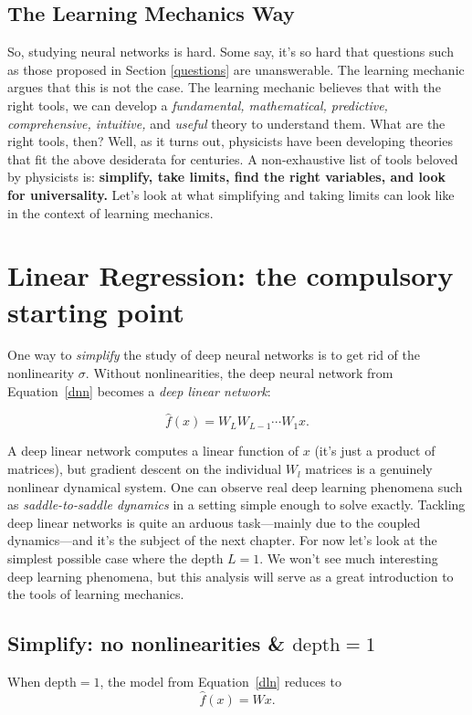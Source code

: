 \subsection{The Learning Mechanics Way}

So, studying neural networks is hard. Some say, it's so hard that questions such as those proposed in Section \ref{questions} are unanswerable. The learning mechanic argues that this is not the case. The learning mechanic believes that with the right tools, we can develop a \textit{fundamental, mathematical, predictive, comprehensive, intuitive,} and \textit{useful} theory to understand them. What are the right tools, then? Well, as it turns out, physicists have been developing theories that fit the above desiderata for centuries. A non-exhaustive list of tools beloved by physicists is: \textbf{simplify, take limits, find the right variables, and look for universality.} Let's look at what simplifying and taking limits can look like in the context of learning mechanics.

\section{Linear Regression: the compulsory starting point}

One way to \textit{simplify} the study of deep neural networks is to get rid of the nonlinearity $\sigma$. Without nonlinearities, the deep neural network from Equation~\eqref{dnn} becomes a \textit{deep linear network}:

\begin{equation}
    \hat{f}(x) = W_L W_{L-1} \cdots W_1 x.
    \label{dln}
\end{equation}

A deep linear network computes a linear function of $x$ (it's just a product of matrices), but gradient descent on the individual $W_{l}$ matrices is a genuinely nonlinear dynamical system. One can observe real deep learning phenomena such as \textit{saddle-to-saddle dynamics} in a setting simple enough to solve exactly. Tackling deep linear networks is quite an arduous task---mainly due to the coupled dynamics---and it's the subject of the next chapter. For now let's look at the simplest possible case where the depth $L = 1$. We won't see much interesting deep learning phenomena, but this analysis will serve as a great introduction to the tools of learning mechanics.

\subsection{Simplify: no nonlinearities \& $\text{depth}=1$}
When $\text{depth}=1$, the model from Equation~\eqref{dln} reduces to
\begin{equation}
    \hat{f}(x) = Wx.
    \label{lr}
\end{equation}

